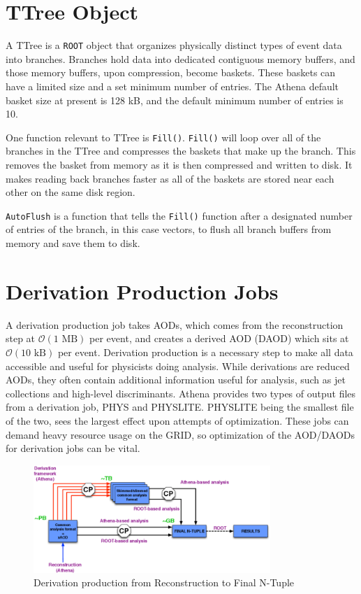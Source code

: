 \section{TTree Object} \label{section: ATLASIO_TTreeObject}
A TTree is a \verb|ROOT| object that organizes physically distinct types of event data into branches.
Branches hold data into dedicated contiguous memory buffers, and those memory buffers, upon compression, become baskets.
These baskets can have a limited size and a set minimum number of entries. 
The Athena default basket size at present is 128 kB, and the default minimum number of entries is 10. 

One function relevant to TTree is \verb|Fill()|. 
\verb|Fill()| will loop over all of the branches in the TTree and compresses the baskets that make up the branch.
This removes the basket from memory as it is then compressed and written to disk.
It makes reading back branches faster as all of the baskets are stored near each other on the same disk region. \cite{ROOT_TTree}

\verb|AutoFlush| is a function that tells the \verb|Fill()| function after a designated number of entries of the branch, in this case vectors, to flush all branch buffers from memory and save them to disk. 


\section{Derivation Production Jobs}
A derivation production job takes AODs, which comes from the reconstruction step at $\mathcal{O}(1 \text{ MB})$ per event, and creates a derived AOD (DAOD) which sits at $\mathcal{O}(10 \text{ kB})$ per event.
Derivation production is a necessary step to make all data accessible and useful for physicists doing analysis.
While derivations are reduced AODs, they often contain additional information useful for analysis, such as jet collections and high-level discriminants.\cite{PHYSLITE_A_new_2024}
Athena provides two types of output files from a derivation job, PHYS and PHYSLITE. 
PHYSLITE being the smallest file of the two, sees the largest effect upon attempts of optimization. 
These jobs can demand heavy resource usage on the GRID, so optimization of the AOD/DAODs for derivation jobs can be vital. 

\begin{figure}[h]
    \centering
    \includegraphics[width=0.8\textwidth]{content/img/catmore-derivation.png}
    \caption{Derivation production from Reconstruction to Final N-Tuple\cite{DAOD_Laycock_2014}}
    \label{fig:IO_derivation_framework}
\end{figure}

